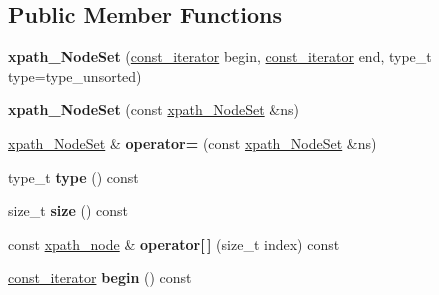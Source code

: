 \subsection*{Public Member Functions}
\begin{DoxyCompactItemize}
\item 
\hypertarget{classphys_1_1xml_1_1xpath__NodeSet_a06c54cc943e8c2b1adbc28f76f624ec7}{
{\bfseries xpath\_\-NodeSet} (\hyperlink{classphys_1_1xml_1_1xpath__node}{const\_\-iterator} begin, \hyperlink{classphys_1_1xml_1_1xpath__node}{const\_\-iterator} end, type\_\-t type=type\_\-unsorted)}
\label{dc/d32/classphys_1_1xml_1_1xpath__NodeSet_a06c54cc943e8c2b1adbc28f76f624ec7}

\item 
\hypertarget{classphys_1_1xml_1_1xpath__NodeSet_a8399c2c6fff5d076f58200b85a666af2}{
{\bfseries xpath\_\-NodeSet} (const \hyperlink{classphys_1_1xml_1_1xpath__NodeSet}{xpath\_\-NodeSet} \&ns)}
\label{dc/d32/classphys_1_1xml_1_1xpath__NodeSet_a8399c2c6fff5d076f58200b85a666af2}

\item 
\hypertarget{classphys_1_1xml_1_1xpath__NodeSet_a80eeb37f3b901606c9df7049e18fdb5c}{
\hyperlink{classphys_1_1xml_1_1xpath__NodeSet}{xpath\_\-NodeSet} \& {\bfseries operator=} (const \hyperlink{classphys_1_1xml_1_1xpath__NodeSet}{xpath\_\-NodeSet} \&ns)}
\label{dc/d32/classphys_1_1xml_1_1xpath__NodeSet_a80eeb37f3b901606c9df7049e18fdb5c}

\item 
\hypertarget{classphys_1_1xml_1_1xpath__NodeSet_aebe10fb6894de3faed443011fe44bccb}{
type\_\-t {\bfseries type} () const }
\label{dc/d32/classphys_1_1xml_1_1xpath__NodeSet_aebe10fb6894de3faed443011fe44bccb}

\item 
\hypertarget{classphys_1_1xml_1_1xpath__NodeSet_a7ba8dfcdd245a28a35f477d00e44a0d3}{
size\_\-t {\bfseries size} () const }
\label{dc/d32/classphys_1_1xml_1_1xpath__NodeSet_a7ba8dfcdd245a28a35f477d00e44a0d3}

\item 
\hypertarget{classphys_1_1xml_1_1xpath__NodeSet_a008704e140bb582a47bce4887d7f59a9}{
const \hyperlink{classphys_1_1xml_1_1xpath__node}{xpath\_\-node} \& {\bfseries operator\mbox{[}$\,$\mbox{]}} (size\_\-t index) const }
\label{dc/d32/classphys_1_1xml_1_1xpath__NodeSet_a008704e140bb582a47bce4887d7f59a9}

\item 
\hypertarget{classphys_1_1xml_1_1xpath__NodeSet_a95e14089db639dc3d854fa0b7c60981a}{
\hyperlink{classphys_1_1xml_1_1xpath__node}{const\_\-iterator} {\bfseries begin} () const }
\label{dc/d32/classphys_1_1xml_1_1xpath__NodeSet_a95e14089db639dc3d854fa0b7c60981a}


\end{DoxyCompactItemize}
